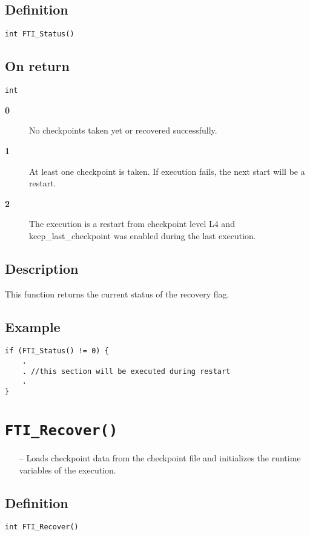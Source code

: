 \documentclass{refrep}
\begin{document}
\subsection*{Definition}
\begin{lstlisting}[frame=single]
int FTI_Status()
\end{lstlisting}
\subsection*{On return}
\begin{lstlisting}[frame=single]
int
\end{lstlisting}
\begin{description}
\item[\textbf{0}] No checkpoints taken yet or recovered successfully.
\item[\textbf{1}] At least one checkpoint is taken. If execution fails, the next start will be a restart.
\item[\textbf{2}] The execution is a restart from checkpoint level L4 and keep\_last\_checkpoint was enabled during the last execution.
\end{description}
\subsection*{Description}
This function returns the current status of the recovery flag.
\subsection*{Example}
\begin{center}
\begin{lstlisting}[frame=single]
if (FTI_Status() != 0) {
    .
    . //this section will be executed during restart
    .
}
\end{lstlisting}
\end{center}
\newpage
\section{\tt FTI\_Recover()}\label{sec:ftirecover}
\begin{framed}
\begin{itemize}
\item[--] Loads checkpoint data from the checkpoint file and initializes the runtime variables of the execution.
\end{itemize}
\end{framed}
\subsection*{Definition}
\begin{lstlisting}[frame=single]
int FTI_Recover()
\end{lstlisting}
\end{document}
